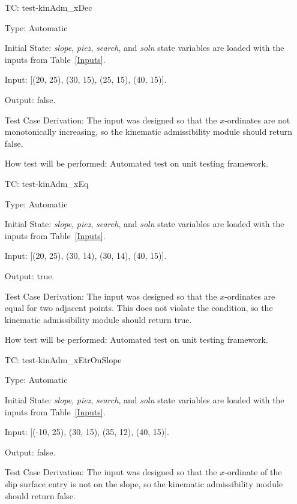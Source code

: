 \documentclass[12pt, titlepage]{article}
\newcounter{utestnum} %
\begin{document}
\begin{enumerate}[label=TC\arabic*:,ref={\arabic*}]
	
	\item [TC\refstepcounter{utestnum}\theutestnum: \label{TC_KinAdmXDec}] 
	test-kinAdm\_xDec
	
	Type: Automatic
	
	Initial State: \textit{slope}, \textit{piez}, \textit{search}, and 
	\textit{soln} state variables are loaded with the inputs from 
	Table~\ref{Inputs}.
	
	Input: [(20, 25), (30, 15), (25, 15), (40, 15)].
	
	Output: false.
	
	Test Case Derivation: The input was designed so that the $x$-ordinates are 
	not monotonically increasing, so the kinematic admissibility module should 
	return false.
	
	How test will be performed: Automated test on unit testing framework.
	
	\item [TC\refstepcounter{utestnum}\theutestnum: \label{TC_KinAdmXEq}] 
	test-kinAdm\_xEq
	
	Type: Automatic
	
	Initial State: \textit{slope}, \textit{piez}, \textit{search}, and 
	\textit{soln} state variables are loaded with the inputs from 
	Table~\ref{Inputs}.
	
	Input: [(20, 25), (30, 14), (30, 14), (40, 15)].
	
	Output: true.
	
	Test Case Derivation: The input was designed so that the $x$-ordinates are 
	equal for two adjacent points. This does not violate the condition, so the 
	kinematic admissibility module should return true.
	
	How test will be performed: Automated test on unit testing framework.
	
	\item [TC\refstepcounter{utestnum}\theutestnum: 
	\label{TC_KinAdmXetrOnSlope}] 
	test-kinAdm\_xEtrOnSlope
	
	Type: Automatic
	
	Initial State: \textit{slope}, \textit{piez}, \textit{search}, and 
	\textit{soln} state variables are loaded with the inputs from 
	Table~\ref{Inputs}.
	
	Input: [(-10, 25), (30, 15), (35, 12), (40, 15)].
	
	Output: false.
	
	Test Case Derivation: The input was designed so that the $x$-ordinate of 
	the slip surface entry is not on the slope, so the kinematic admissibility 
	module should return false.
	

\end{enumerate}
\end{document}
